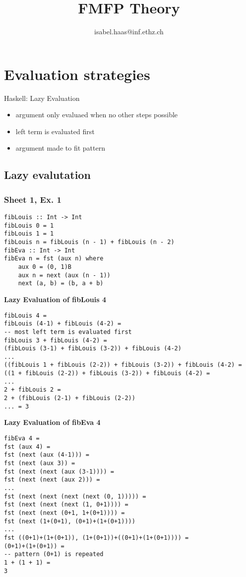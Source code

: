\documentclass[12pt]{article}
\title{FMFP Theory}
\author{isabel.haas@inf.ethz.ch}
\begin{document}
\maketitle


\section{Evaluation strategies}
Haskell: Lazy Evaluation 
\begin{itemize}
    \item argument only evaluaed when no other steps possible
    \item left term is evaluated first
    \item argument made to fit pattern
\end{itemize}
\subsection{Lazy evalutation}
\subsubsection{Sheet 1, Ex. 1}
\begin{verbatim}
fibLouis :: Int -> Int
fibLouis 0 = 1
fibLouis 1 = 1
fibLouis n = fibLouis (n - 1) + fibLouis (n - 2)
fibEva :: Int -> Int
fibEva n = fst (aux n) where 
    aux 0 = (0, 1)B
    aux n = next (aux (n - 1))
    next (a, b) = (b, a + b)
\end{verbatim}
\textbf{Lazy Evaluation of fibLouis 4}
\begin{verbatim}
fibLouis 4 =
fibLouis (4-1) + fibLouis (4-2) =
-- most left term is evaluated first
fibLouis 3 + fibLouis (4-2) =
(fibLouis (3-1) + fibLouis (3-2)) + fibLouis (4-2) 
...
((fibLouis 1 + fibLouis (2-2)) + fibLouis (3-2)) + fibLouis (4-2) =
((1 + fibLouis (2-2)) + fibLouis (3-2)) + fibLouis (4-2) =
...
2 + fibLouis 2 =
2 + (fibLouis (2-1) + fibLouis (2-2))
... = 3
\end{verbatim}
\textbf{Lazy Evaluation of fibEva 4}
\begin{verbatim}
fibEva 4 =
fst (aux 4) =
fst (next (aux (4-1))) =
fst (next (aux 3)) =
fst (next (next (aux (3-1)))) =
fst (next (next (aux 2))) =
...
fst (next (next (next (next (0, 1))))) =
fst (next (next (next (1, 0+1)))) =
fst (next (next (0+1, 1+(0+1)))) =
fst (next (1+(0+1), (0+1)+(1+(0+1)))) 
...
fst ((0+1)+(1+(0+1)), (1+(0+1))+((0+1)+(1+(0+1)))) =
(0+1)+(1+(0+1)) =
-- pattern (0+1) is repeated
1 + (1 + 1) =
3
\end{verbatim}
\end{document}
